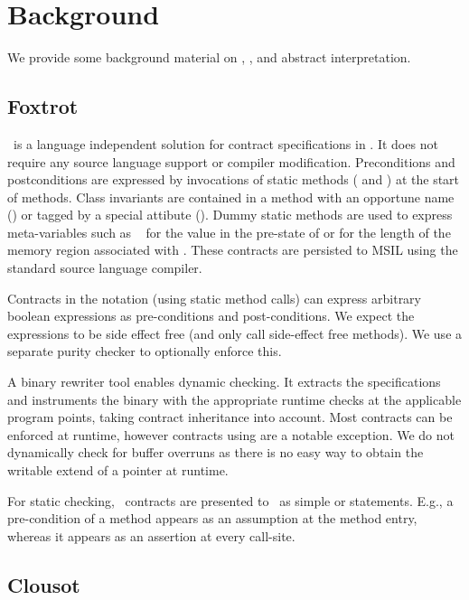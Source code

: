\documentclass[10pt]{sigplanconf}
\begin{document}
\section{Background}

We provide some background material on \Foxtrot, \Clousot, and abstract interpretation.

\subsection{Foxtrot}
\label{sec:foxtrot}
\Foxtrot\ is a language independent solution for contract
specifications in \NET.  It does not require any source language
support or compiler modification.  Preconditions and postconditions
are expressed by invocations of static methods
( and ) at the start of
methods.  Class
invariants are contained in a method with an opportune name
() or tagged by a special attibute
(\code{[ObjectInvariant]}).  Dummy static methods are used to express
meta-variables such as \eg\  for the value in the
pre-state of  or  for the
length of the memory region associated with . These contracts are
persisted to MSIL using the standard source language compiler.

Contracts in the \Foxtrot{} notation (using static method calls) can
express arbitrary boolean expressions as pre-conditions and
post-conditions. We expect the expressions to be side effect free (and
only call side-effect free methods). We use a separate purity checker
to optionally enforce this. 

A binary rewriter tool enables dynamic checking.  It extracts the
specifications and instruments the binary with the appropriate runtime
checks at the applicable program points, taking contract inheritance
into account. Most \Foxtrot{} contracts can be enforced at runtime,
however contracts using  are a notable exception. 
We do not dynamically check for buffer overruns as there is no easy
way to obtain the writable extend of a pointer at runtime. 

For static checking, \Foxtrot\ contracts are presented
to \Clousot\ as simple  or 
statements. E.g., a pre-condition of a method appears as an assumption
at the method entry, whereas it appears as an assertion at every
call-site.

\subsection{Clousot}
\end{document}
